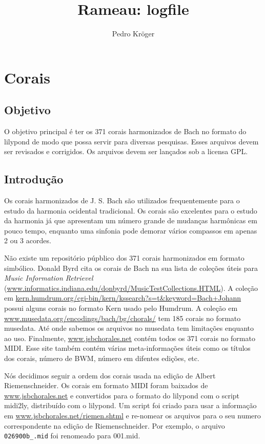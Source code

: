 \documentclass[12pt,brazil]{book}
\title{Rameau: logfile}
\author{Pedro Kröger}
\begin{document}
\graphicspath{{figs/}}

\maketitle

\chapter{Corais}
\label{chap:corais}

\section{Objetivo}
\label{sec:objetivo}

O objetivo principal é ter os 371 corais harmonizados de Bach no
formato do lilypond de modo que possa servir para diversas pesquisas.
Esses arquivos devem ser revisados e corrigidos. Os arquivos devem ser
lançados sob a licensa GPL.

\section{Introdução}
\label{sec:introducao}

Os corais harmonizados de J. S. Bach são utilizados frequentemente
para o estudo da harmonia ocidental tradicional. Os corais são
excelentes para o estudo da harmonia já que apresentam um número
grande de mudanças harmônicas em pouco tempo, enquanto uma sinfonia
pode demorar vários compassos em apenas 2 ou 3 acordes.

Não existe um repositório púpblico dos 371 corais harmonizados em
formato simbólico. Donald Byrd cita os corais de Bach na sua lista de
coleções úteis para \textit{Music Information Retrievel}
(\url{www.informatics.indiana.edu/donbyrd/MusicTestCollections.HTML}).
A coleção em
\url{kern.humdrum.org/cgi-bin/kern/kssearch?s=t&keyword=Bach+Johann}
possui alguns corais no formato Kern usado pelo Humdrum. A coleção em
\url{www.musedata.org/encodings/bach/bg/chorals/} tem 185 corais no
formato musedata. Até onde sabemos os arquivos no musedata tem
limitações enquanto ao uso. Finalmente, \url{www.jsbchorales.net}
contém todos os 371 corais no formato MIDI. Esse site também contém
várias meta-informações úteis como os títulos dos corais, número de
BWM, número em difentes edições, etc.

Nós decidimos seguir a ordem dos corais usada na edição de Albert
Riemenschneider. Os corais em formato MIDI foram baixados de
\url{www.jsbchorales.net} e convertidos para o formato do lilypond com
o script midi2ly, distribuído com o lilypond. Um script foi criado
para usar a informação em \url{www.jsbchorales.net/riemen.shtml} e
re-nomear os arquivos para o seu numero correspondente na edição de
Riemenschneider. Por exemplo, o arquivo \texttt{026900b\_.mid} foi
renomeado para 001.mid.
\end{document}
